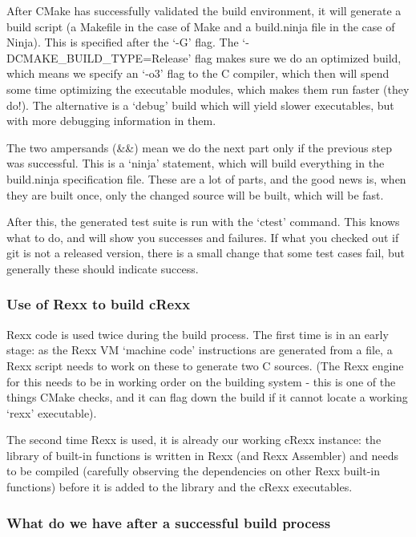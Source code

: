 After CMake has successfully validated the build environment, it will
generate a build script (a Makefile in the case of Make and a
build.ninja file in the case of Ninja). This is specified after the `-G'
flag. The `-DCMAKE\_BUILD\_TYPE=Release' flag makes sure we do an
optimized build, which means we specify an `-o3' flag to the C compiler,
which then will spend some time optimizing the executable modules, which
makes them run faster (they do!). The alternative is a `debug' build
which will yield slower executables, but with more debugging information
in them.

The two ampersands (\&\&) mean we do the next part only if the previous
step was successful. This is a `ninja' statement, which will build
everything in the build.ninja specification file. These are a lot of
parts, and the good news is, when they are built once, only the changed
source will be built, which will be fast.

After this, the generated test suite is run with the `ctest' command.
This knows what to do, and will show you successes and failures. If what
you checked out if git is not a released version, there is a small
change that some test cases fail, but generally these should indicate
success.

\hypertarget{use-of-rexx-to-build-crexx}{%
\subsubsection{Use of Rexx to build
cRexx}\label{use-of-rexx-to-build-crexx}}

Rexx code is used twice during the build process. The first time is in
an early stage: as the Rexx VM `machine code' instructions are generated
from a file, a Rexx script needs to work on these to generate two C
sources. (The Rexx engine for this needs to be in working order on the
building system - this is one of the things CMake checks, and it can
flag down the build if it cannot locate a working `rexx' executable).

The second time Rexx is used, it is already our working cRexx instance:
the library of built-in functions is written in Rexx (and Rexx
Assembler) and needs to be compiled (carefully observing the
dependencies on other Rexx built-in functions) before it is added to the
library and the cRexx executables.

\hypertarget{what-do-we-have-after-a-successful-build-process}{%
\subsubsection{What do we have after a successful build
process}\label{what-do-we-have-after-a-successful-build-process}}

